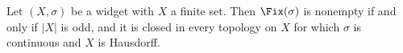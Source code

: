 \begin{theorem}[Main]\label{dm-0003}
Let $(X,\sigma)$ be a widget with $X$ a finite set. Then $\Fix(\sigma)$ is nonempty if and only if $|X|$ is odd, and it is closed in every topology on $X$ for which $\sigma$ is continuous and $X$ is Hausdorff.
\end{theorem}